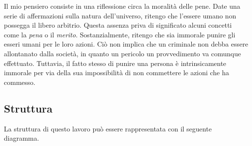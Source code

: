 \documentclass[a4paper, 12pt]{article}
\begin{document}
Il mio pensiero consiste in una riflessione circa la moralità delle pene.
Date una serie di affermazioni sulla natura dell'universo, ritengo che l'essere umano
non possegga il libero arbitrio. Questa assenza priva di significato alcuni concetti come la
\textit{pena} o il \textit{merito}. Sostanzialmente, ritengo che sia immorale punire gli esseri
umani per le loro azioni. Ciò non implica che un criminale non debba essere allontanato dalla società,
in quanto un pericolo un provvedimento va comunque effettuato. Tuttavia,
il fatto stesso di punire una persona è intrinsicamente immorale per via
della sua impossibilità di non commettere le azioni che ha commesso.

\pagebreak

\subsection{Struttura}

La struttura di questo lavoro può essere rappresentata con il seguente diagramma.

\vspace{0.75cm}

\end{document}
